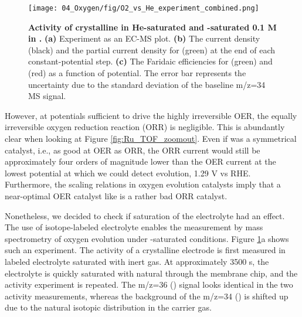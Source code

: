 \begin{figure}[t!]
	\texttt{[image: 04\_Oxygen/fig/O2\_vs\_He\_experiment\_combined.png]}
	\caption{\textbf{Activity of crystalline  in He-saturated and -saturated 0.1 M  in .} \textbf{(a)} Experiment as an EC-MS plot. \textbf{(b)} The current density (black) and the partial current density for  (green) at the end of each constant-potential step. \textbf{(c)} The Faridaic efficiencies for  (green) and  (red) as a function of potential. The error bar represents the uncertainty due to the standard deviation of the baseline m/z=34 MS signal.}
	\label{fig:He_vs_O2}
\end{figure}

However, at potentials sufficient to drive the highly irreversible OER, the equally irreversible oxygen reduction reaction (ORR) is negligible. This is abundantly clear when looking at Figure \ref{fig:Ru_TOF_zoomout}. Even if  was a symmetrical catalyst, i.e., as good at OER as ORR, the ORR current would still be approximately four orders of magnitude lower than the OER current at the  lowest potential at which we could detect  evolution, 1.29 V vs RHE. Furthermore, the scaling relations in oxygen evolution catalysts imply that a near-optimal OER catalyst like  is a rather bad ORR catalyst\cite{Busch2016}. 

Nonetheless, we decided to check if  saturation of the electrolyte had an effect. The use of isotope-labeled electrolyte enables the measurement by mass spectrometry of oxygen evolution under -saturated conditions. Figure \ref{fig:He_vs_O2}a shows such an experiment. The activity of a crystalline  electrode is first measured in labeled electrolyte saturated with inert gas. At approximately 3500 s, the electrolyte is quickly saturated with natural  through the membrane chip, and the activity experiment is repeated. The m/z=36 () signal looks identical in the two activity measurements, whereas the background of the m/z=34 () is shifted up due to the natural isotopic distribution in the  carrier gas. 

